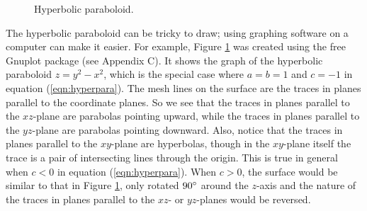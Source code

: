 \begin{figure}[h]
 \begin{center}
  
 \end{center}\vspace{-12mm}
 \caption[]{\quad Hyperbolic paraboloid.}
 \label{fig:hyperpara}
\end{figure}

The hyperbolic paraboloid can be tricky to draw; using graphing software on a computer can make it
easier.
For example, Figure \ref{fig:hyperpara} was created using the free Gnuplot package (see Appendix C). It shows the graph
of the hyperbolic paraboloid
$z = y^2 - x^2$, which is the special case where $a = b = 1$ and $c = -1$ in equation (\ref{eqn:hyperpara}).
The mesh lines on the surface are the traces in planes parallel to the coordinate planes.
So we see that the traces in planes parallel to the $xz$-plane are parabolas pointing upward,
while the traces in planes parallel to the $yz$-plane are parabolas pointing downward. Also, notice that the traces in
planes parallel to the $xy$-plane are hyperbolas, though in the $xy$-plane itself the trace is a pair of intersecting
lines through the origin. 
This is true in general when $c < 0$ in equation (\ref{eqn:hyperpara}).
When $c > 0$, the surface would be similar to that
in Figure \ref{fig:hyperpara}, only rotated $90^\circ$ around the $z$-axis and the nature
of the traces in planes parallel to the $xz$- or $yz$-planes would be reversed.

